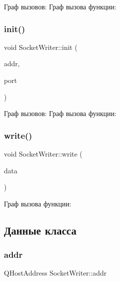 Граф вызовов\+:
Граф вызова функции\+:
\mbox{\label{class_socket_writer_a5d43a4e3d17abbaff37887a174ef6c00}} 
\subsubsection{\texorpdfstring{init()}{init()}}
{\footnotesize\ttfamily void Socket\+Writer\+::init (\begin{DoxyParamCaption}\item[{Q\+String}]{addr,  }\item[{int}]{port }\end{DoxyParamCaption})\hspace{0.3cm}{\ttfamily [static]}}

Граф вызовов\+:
Граф вызова функции\+:
\mbox{\label{class_socket_writer_a64eb590cc3343ca1072ca2896ec9a7ce}} 
\subsubsection{\texorpdfstring{write()}{write()}}
{\footnotesize\ttfamily void Socket\+Writer\+::write (\begin{DoxyParamCaption}\item[{Q\+Byte\+Array}]{data }\end{DoxyParamCaption})}

Граф вызова функции\+:


\subsection{Данные класса}
\mbox{\label{class_socket_writer_aeee2a61724537288bb2cb96d257a24d6}} 
\subsubsection{\texorpdfstring{addr}{addr}}
{\footnotesize\ttfamily Q\+Host\+Address Socket\+Writer\+::addr}

\mbox{\label{class_socket_writer_a1fecba79e921d49c9ce5daa97e536121}} 
